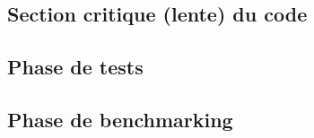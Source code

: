 \documentclass{article}
\begin{document}
\subsection{Section critique (lente) du code}
\subsection{Phase de tests}

\subsection{Phase de benchmarking}
\end{document}
